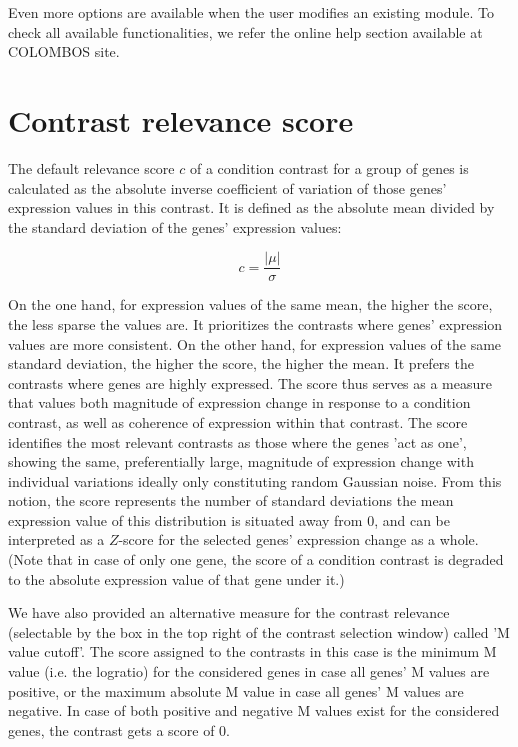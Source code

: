 Even more options are available when the user modifies an existing
module.  To check all available functionalities, we refer the online
help section available at COLOMBOS site.



\section{Contrast relevance score}\label{apd:contrast-score}

The default relevance score $c$ of a condition contrast for a group
of genes is calculated as the absolute inverse coefficient of
variation of those genes’ expression values in this contrast. It
is defined as the absolute mean divided by the standard deviation
of the genes’ expression values:

\begin{equation}
c=\frac{|\mu|}{\sigma}
\end{equation}
 
On the one hand, for expression values of the same mean, the
higher the score, the less sparse the values are. It prioritizes
the contrasts where genes’ expression values are more
consistent. On the other hand, for expression values of the same
standard deviation, the higher the score, the higher the mean. It
prefers the contrasts where genes are highly expressed. The score
thus serves as a measure that values both magnitude of expression
change in response to a condition contrast, as well as coherence
of expression within that contrast. The score identifies the most
relevant contrasts as those where the genes 'act as one', showing
the same, preferentially large, magnitude of expression change
with individual variations ideally only constituting random
Gaussian noise. From this notion, the score represents the number
of standard deviations the mean expression value of this
distribution is situated away from $0$, and can be interpreted as a
$Z$-score for the selected genes' expression change as a
whole. (Note that in case of only one gene, the score of a
condition contrast is degraded to the absolute expression value
of that gene under it.)

We have also provided an alternative measure for the contrast
relevance (selectable by the box in the top right of the contrast
selection window) called 'M value cutoff'.  The score assigned to
the contrasts in this case is the minimum M value (i.e. the
logratio) for the considered genes in case all genes' M values
are positive, or the maximum absolute M value in case all genes'
M values are negative.  In case of both positive and negative M
values exist for the considered genes, the contrast gets a score
of 0.



